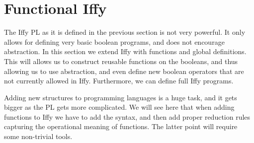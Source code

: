 \documentclass{article}
\begin{document}
\section{Functional Iffy}
\label{sec:functional_iffy}
The Iffy PL as it is defined in the previous section is not very
powerful.  It only allows for defining very basic boolean programs,
and does not encourage abstraction.  In this section we extend Iffy
with functions and global definitions.  This will allows us to
construct reusable functions on the booleans, and thus allowing us to
use abstraction, and even define new boolean operators that are not
currently allowed in Iffy.  Furthermore, we can define full Iffy
programs.

Adding new structures to programming languages is a huge task, and it
gets bigger as the PL gets more complicated.  We will see here that
when adding functions to Iffy we have to add the syntax, and then add
proper reduction rules capturing the operational meaning of functions.
The latter point will require some non-trivial tools.
\end{document}
